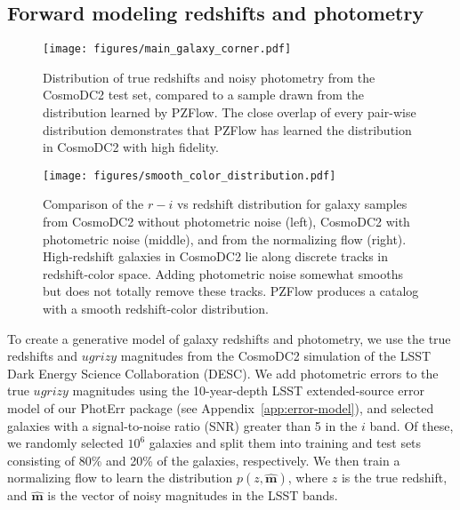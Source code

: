 \documentclass[twocolumn,twocolappendix]{aastex631}
\begin{document}
\subsection{Forward modeling redshifts and photometry}
\label{sec:fwd-model}

\begin{figure*}[t]
    \begin{centering}
        \texttt{[image: figures/main\_galaxy\_corner.pdf]}
        \caption{
            Distribution of true redshifts and noisy photometry from the CosmoDC2 test set, compared to a sample drawn from the distribution learned by PZFlow.
            The close overlap of every pair-wise distribution demonstrates that PZFlow has learned the distribution in CosmoDC2 with high fidelity.
        }
        \label{fig:main-corner}
    \end{centering}
\end{figure*}

\begin{figure*}[t]
    \begin{centering}
        \texttt{[image: figures/smooth\_color\_distribution.pdf]}
        \caption{
            Comparison of the $r-i$ vs redshift distribution for galaxy samples from CosmoDC2 without photometric noise (left), CosmoDC2 with photometric noise (middle), and from the normalizing flow (right).
            High-redshift galaxies in CosmoDC2 lie along discrete tracks in redshift-color space.
            Adding photometric noise somewhat smooths but does not totally remove these tracks.
            PZFlow produces a catalog with a smooth redshift-color distribution.
        }
        \label{fig:smooth-color-dist}
    \end{centering}
\end{figure*}

To create a generative model of galaxy redshifts and photometry, we use the true redshifts and $ugrizy$ magnitudes from the CosmoDC2 simulation \citep{dc2, cosmodc2} of the LSST Dark Energy Science Collaboration (DESC).
We add photometric errors to the true $ugrizy$ magnitudes using the 10-year-depth LSST extended-source error model of our PhotErr package (see Appendix~\ref{app:error-model}), and selected galaxies with a signal-to-noise ratio (SNR) greater than 5 in the $i$ band.
Of these, we randomly selected $10^6$ galaxies and split them into training and test sets consisting of 80\% and 20\% of the galaxies, respectively.
We then train a normalizing flow to learn the distribution $p(z, \mathbf{\hat{m}})$, where $z$ is the true redshift, and $\mathbf{\hat{m}}$ is the vector of noisy magnitudes in the LSST bands.
\end{document}
